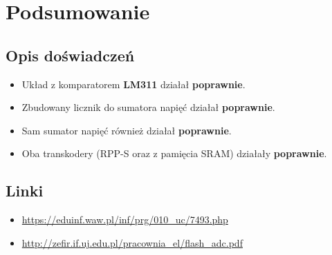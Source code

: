 \chapter{Podsumowanie}

\section{Opis doświadczeń}
\begin{itemize}
    \item Układ z komparatorem \textbf{LM311} działał \textbf{poprawnie}.
    \item Zbudowany licznik do sumatora napięć działał \textbf{poprawnie}.
    \item Sam sumator napięć również działał \textbf{poprawnie}.
    \item Oba transkodery (RPP-S oraz z pamięcia SRAM) działały \textbf{poprawnie}.
\end{itemize}

\section{Linki}

\begin{itemize}
    \item \label{link:7493} \url{https://eduinf.waw.pl/inf/prg/010_uc/7493.php}
    \item \label{link:flash} \url{http://zefir.if.uj.edu.pl/pracownia_el/flash_adc.pdf}
\end{itemize}